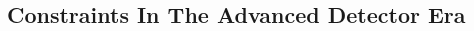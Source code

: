 \documentclass[a0,landscape]{a0poster}
\newcommand{\cbcrate}{{{\mathcal R}}}
\newcommand{\diff}{{\mathrm d}}
\def\gw#1{gravitational wave#1 (GW#1)\gdef\gw{GW}}
\begin{document}
\begin{multicols}{4}
\section*{\centering Constraints In The Advanced Detector Era}

\end{multicols}
\end{document}
